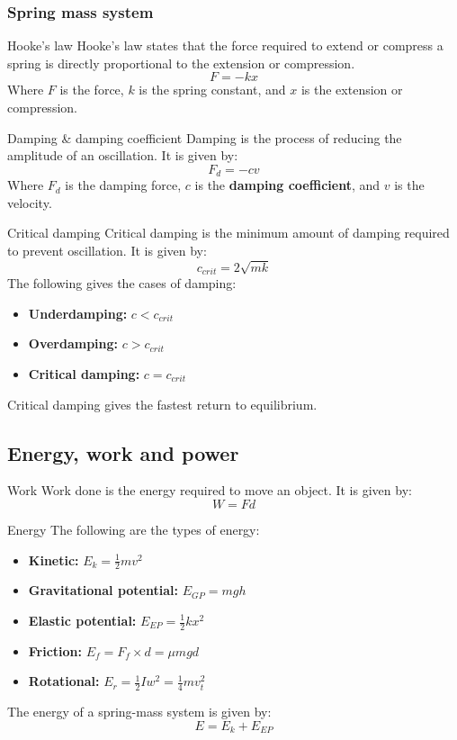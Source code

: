 \subsubsection{Spring mass system}

\begin{definition}
    {Hooke's law}
    Hooke's law states that the force required to extend or compress a spring is directly proportional to the extension or compression.
    \[F=-kx\]
    Where $F$ is the force, $k$ is the spring constant, and $x$ is the extension or compression.
\end{definition}

\begin{definition}
    {Damping \& damping coefficient}
    Damping is the process of reducing the amplitude of an oscillation. It is given by:
    \[F_d=-cv\]
    Where $F_d$ is the damping force, $c$ is the \textbf{damping coefficient}, and $v$ is the velocity.
\end{definition}

\begin{theorem}
    {Critical damping}
    Critical damping is the minimum amount of damping required to prevent oscillation. It is given by:
    \[c_{crit}=2\sqrt{mk}\]
    The following gives the cases of damping:
    \begin{itemize}
        \item \textbf{Underdamping: }$c<c_{crit}$
        \item \textbf{Overdamping: }$c>c_{crit}$
        \item \textbf{Critical damping: }$c=c_{crit}$
    \end{itemize}
    Critical damping gives the fastest return to equilibrium.
\end{theorem}

\subsection{Energy, work and power}

\begin{definition}
    {Work}
    Work done is the energy required to move an object. It is given by:
    \[W=Fd\]
\end{definition}

\begin{theorem}
    {Energy}
    The following are the types of energy:
    \begin{itemize}
        \item \textbf{Kinetic: }$E_k=\frac{1}{2}mv^2$
        \item \textbf{Gravitational potential: }$E_{GP}=mgh$
        \item \textbf{Elastic potential: }$E_{EP}=\frac{1}{2}kx^2$
        \item \textbf{Friction: } $E_{f}=F_f\times d=\mu mgd$
        \item \textbf{Rotational: } $E_{r}=\frac{1}{2}Iw^2=\frac14mv_t^2$
    \end{itemize}
    The energy of a spring-mass system is given by:
    \[E=E_k+E_{EP}\]
\end{theorem}

